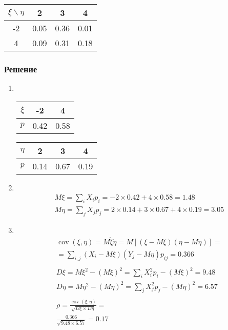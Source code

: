\documentclass[12pt]{article}
\DeclareMathOperator{\cov}{cov}
\begin{document}
\begin{tabular}{|c|c|c|c|}
	\hline
	$\xi \backslash \eta$ & 2    & 3    & 4    \\
	\hline
	-2                    & 0.05 & 0.36 & 0.01 \\
	\hline
	4                     & 0.09 & 0.31 & 0.18 \\
	\hline
\end{tabular}

\subsubsection*{Решение}

\begin{enumerate}
	\item \mbox{}\\
	      \begin{tabular}{|c|c|c|}
		      \hline
		      $\xi $ & -2   & 4    \\
		      \hline
		      $p$    & 0.42 & 0.58 \\
		      \hline
	      \end{tabular}
	      \begin{tabular}{|c|c|c|c|}
		      \hline
		      $\eta $ & 2    & 3    & 4    \\
		      \hline
		      $p$     & 0.14 & 0.67 & 0.19 \\
		      \hline
	      \end{tabular}

	\item \mbox{}\\
	      \begin{gather*}
		      M\xi = \sum_iX_ip_i = -2 \times 0.42 + 4 \times 0.58 = 1.48 \\
		      M\eta = \sum_jX_jp_j = 2 \times 0.14 + 3 \times 0.67 + 4 \times 0.19 = 3.05
	      \end{gather*}

	\item \mbox{}\\
	      \begin{gather*}
		      \cov(\xi, \eta) = M\mathring{\xi}\mathring{\eta} = M[(\xi - M\xi)(\eta - M\eta)] = \\
		      = \sum_{i,j}(X_i - M\xi)(Y_j - M\eta)p_{ij} = 0.366
		      \\\\
		      D\xi = M\xi^2 - (M\xi)^2 = \sum_iX_i^2p_i - (M\xi)^2 = 9.48 \\
		      D\eta = M\eta^2 - (M\eta)^2 = \sum_jX_j^2p_j - (M\eta)^2 = 6.57
		      \\\\
		      \rho = \frac{\cov(\xi, \eta)}{\sqrt{D\xi \times D\eta}} = \\
		      \frac{0.366}{\sqrt{9.48 \times 6.57}} = 0.17
	      \end{gather*}


\end{enumerate}
\end{document}
